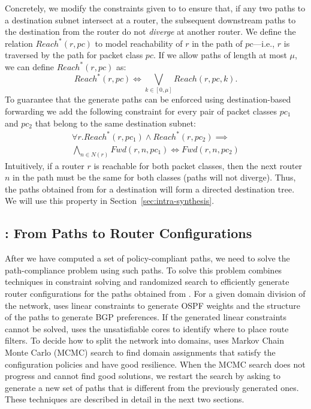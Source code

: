 Concretely, we modify the constraints given to \genesis to ensure that,
if any two paths to a destination subnet intersect at a router,
the subsequent downstream paths to the destination from the
router do not \emph{diverge} at another router.  
We define the relation $Reach^*(r,pc)$ to model reachability 
of $r$ in the path of $pc$---i.e., $r$ is traversed by the path for packet class $pc$. 
If we allow paths of length at most $\mu$, we can define $Reach^*(r,pc)$ as:
\begin{equation}
	Reach^*(r,pc) \Leftrightarrow \bigvee_{k \in [0, \mu]} Reach(r, pc, k).
\end{equation}
To guarantee that the generate paths can be enforced using destination-based
forwarding we add
the following constraint for every pair of packet classes $pc_1$ and $pc_2$ that belong to the same 
 destination subnet:
 \begin{multline}
 \forall r. Reach^*(r, pc_1) \wedge Reach^*(r, pc_2) 
 \implies \\ \bigwedge_{n \in N(r)} Fwd(r, n, pc_1) \Leftrightarrow Fwd(r, n, pc_2)
 \end{multline}
Intuitively, 
 if a router $r$ is reachable for both packet classes, 
 then the next router $n$ in the path must be the same for both classes
 (paths will not diverge). Thus, the paths obtained
 from \genesis for a destination will form a 
 directed destination tree.
 We will use this property in Section~\ref{sec:intra-synthesis}. 

\subsection{\name: From Paths to Router Configurations} 
After we have computed a set of policy-compliant paths,
we need to solve the path-compliance problem using such paths.
To solve this problem \name
combines techniques in constraint solving and randomized search
to efficiently generate router configurations for the paths obtained from \genesis.
For a given domain division of the network,
\name uses linear constraints to generate OSPF weights and 
the structure of the paths  to generate BGP preferences.
If the generated linear  constraints cannot be solved, \name uses the unsatisfiable cores to
identify where to place route filters.
To decide how to split the network into domains,
\name uses Markov Chain Monte Carlo (MCMC) search to find
domain assignments that satisfy the configuration policies and have good resilience.
When the MCMC search does not progress and cannot find good solutions,
we restart the search by asking \genesis to generate a new set of paths that is different from
the previously generated ones.
These techniques are described in detail in the next two sections.

